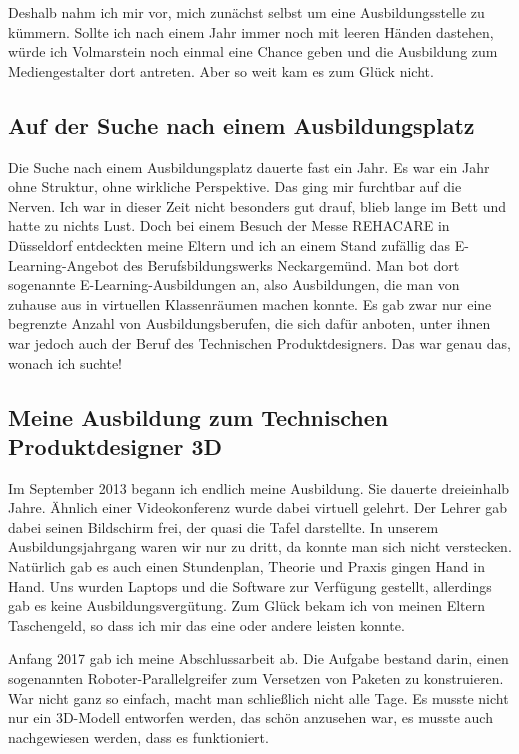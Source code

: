 \documentclass[fontsize=14pt,a4paper,headinclude,DIV=calc,automark]{scrbook}
\begin{document}
Deshalb nahm ich mir vor, mich zunächst selbst um eine Ausbildungsstelle zu kümmern. Sollte ich nach einem Jahr immer noch mit leeren Händen dastehen, würde ich Volmarstein noch einmal eine Chance geben und die Ausbildung zum Mediengestalter dort antreten. Aber so weit kam es zum Glück nicht.

\subsection{Auf der Suche nach einem Ausbildungsplatz}

Die Suche nach einem Ausbildungsplatz dauerte fast ein Jahr. Es war ein Jahr ohne Struktur, ohne wirkliche Perspektive. Das ging mir furchtbar auf die Nerven. Ich war in dieser Zeit nicht besonders gut drauf, blieb lange im Bett und hatte zu nichts Lust. Doch bei einem Besuch der Messe REHACARE in Düsseldorf entdeckten meine Eltern und ich an einem Stand zufällig das E-Learning-Angebot des Berufsbildungswerks Neckargemünd. Man bot dort sogenannte E-Learning-Ausbildungen an, also Ausbildungen, die man von zuhause aus in virtuellen Klassenräumen machen konnte. Es gab zwar nur eine begrenzte Anzahl von Ausbildungsberufen, die sich dafür anboten, unter ihnen war jedoch auch der Beruf des Technischen Produktdesigners. Das war genau das, wonach ich suchte!

\subsection{Meine Ausbildung zum Technischen Produktdesigner 3D}

Im September 2013 begann ich endlich meine Ausbildung. Sie dauerte dreieinhalb Jahre. Ähnlich einer Videokonferenz wurde dabei virtuell gelehrt. Der Lehrer gab dabei seinen Bildschirm frei, der quasi die Tafel darstellte. In unserem Ausbildungsjahrgang waren wir nur zu dritt, da konnte man sich nicht verstecken. Natürlich gab es auch einen Stundenplan, Theorie und Praxis gingen Hand in Hand. Uns wurden Laptops und die Software zur Verfügung gestellt, allerdings gab es keine Ausbildungsvergütung. Zum Glück bekam ich von meinen Eltern Taschengeld, so dass ich mir das eine oder andere leisten konnte.

Anfang 2017 gab ich meine Abschlussarbeit ab. Die Aufgabe bestand darin, einen sogenannten Roboter-Parallelgreifer zum Versetzen von Paketen zu konstruieren. War nicht ganz so einfach, macht man schließlich nicht alle Tage. Es musste nicht nur ein 3D-Modell entworfen werden, das schön anzusehen war, es musste auch nachgewiesen werden, dass es funktioniert.
\end{document}
